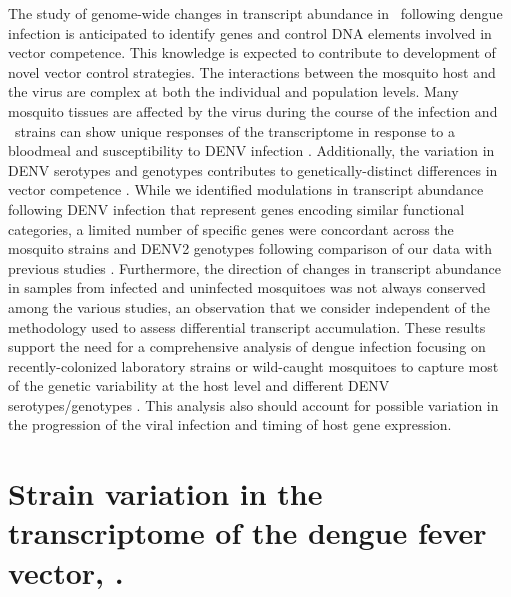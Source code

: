 The study of genome-wide changes in transcript abundance in \Aa\ following dengue infection is anticipated to identify genes and control DNA elements involved in vector competence.
This knowledge is expected to contribute to development of novel vector control strategies.
The interactions between the mosquito host and the virus are complex at both the individual and population levels.
Many mosquito tissues are affected by the virus during the course of the infection and \Aa\ strains can show unique responses of the transcriptome in response to a bloodmeal and susceptibility to \gls{DENV} infection \cite{Black2002,bonizzoni2012strain}.
Additionally, the variation in \gls{DENV} serotypes and genotypes contributes to genetically-distinct differences in vector competence \cite{Anderson2006,Weaver2009}.
While we identified modulations in transcript abundance following \gls{DENV} infection that represent genes encoding similar functional categories, a limited number of specific genes were concordant across the mosquito strains and \gls{DENV}2 genotypes following comparison of our data with previous studies \cite{Xi2008,Luplertlop2011,Behura2011,Sim2012,Colpitts2011}.
Furthermore, the direction of changes in transcript abundance in samples from infected and uninfected mosquitoes was not always conserved among the various studies, an observation that we consider independent of the methodology used to assess differential transcript accumulation.
These results support the need for a comprehensive analysis of dengue infection focusing on recently-colonized laboratory strains or wild-caught mosquitoes to capture most of the genetic variability at the host level and different \gls{DENV} serotypes/genotypes \cite{Armstrong2001}.
This analysis also should account for possible variation in the progression of the viral infection and timing of host gene expression.



\pagebreak
\section{Strain variation in the transcriptome of the dengue fever vector, \Aea. \cite{bonizzoni2012strain}}





